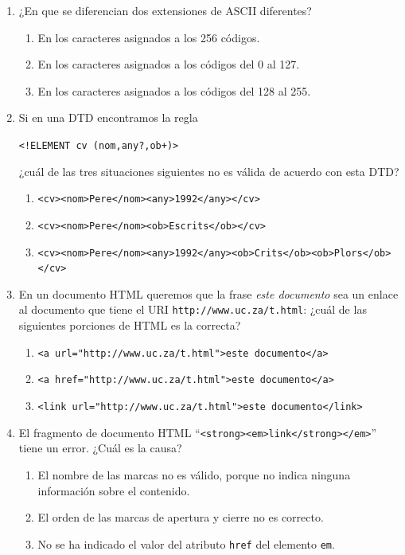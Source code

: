 \begin{enumerate}
\item ¿En que se diferencian dos extensiones de ASCII diferentes? \begin{enumerate} \item En los caracteres asignados a los 256 códigos. \item En los caracteres asignados a los códigos del 0 al 127. \item En los caracteres asignados a los códigos del 128 al 255. \end{enumerate} 

\item Si en una DTD encontramos la regla \begin{center}\verb|<!ELEMENT cv (nom,any?,ob+)>|\end{center} ¿cuál de las tres situaciones siguientes no es válida de acuerdo con esta DTD? \begin{enumerate} \item \verb|<cv><nom>Pere</nom><any>1992</any></cv>| \item \verb|<cv><nom>Pere</nom><ob>Escrits</ob></cv>| \item \verb|<cv><nom>Pere</nom><any>1992</any><ob>Crits</ob><ob>Plors</ob></cv>| \end{enumerate} 

\item En un documento HTML queremos que la frase \emph{este documento} sea un enlace al documento que tiene el URI \verb|http://www.uc.za/t.html|: ¿cuál de las siguientes porciones de HTML es la correcta? \begin{enumerate} \item \verb|<a url="http://www.uc.za/t.html">este documento</a>| \item \verb|<a href="http://www.uc.za/t.html">este documento</a>| \item \verb|<link url="http://www.uc.za/t.html">este documento</link>| \end{enumerate} 

\item El fragmento de documento HTML ``\verb|<strong><em>link</strong></em>|'' tiene un error. ¿Cuál es la causa? \begin{enumerate} \item El nombre de las marcas no es válido, porque no  indica ninguna información sobre el contenido. \item El orden de las marcas de apertura y cierre no es correcto. \item No se ha indicado el valor del atributo \verb|href| del elemento \verb|em|. \end{enumerate} 


\end{enumerate}
